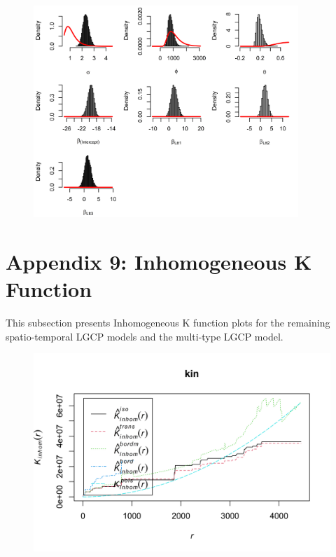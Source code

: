     \begin{figure}[H]
        \begin{center}
            \includegraphics[width = \linewidth, height = 80mm]{Prior and posterior density plots - Major 13456.png}
        \end{center}
    \end{figure}

    \newpage


\section*{Appendix 9: Inhomogeneous K Function} \label{app:inhomogeneous-k-function}

    This subsection presents Inhomogeneous K function plots for the remaining spatio-temporal LGCP models and the multi-type LGCP model.

    \begin{figure}[H]
        \begin{center}
            \includegraphics[width=\linewidth]{Inhomogeneous K Function - Major 2.png}
        \end{center}
    \end{figure}

